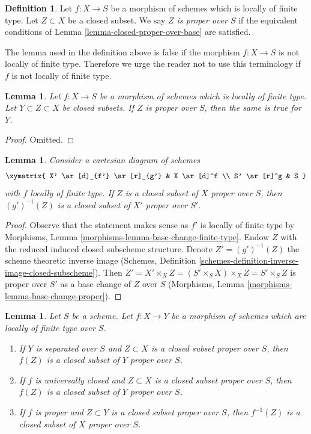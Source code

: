\documentclass[10pt,a4paper]{amsart}
\theoremstyle{plain}
\newtheorem{lemma}[subsection]{Lemma}
\theoremstyle{definition}
\newtheorem{definition}[subsection]{Definition}
\theoremstyle{remark}
\numberwithin{equation}{subsection}
\begin{document}
\begin{definition}
\label{definition-proper-over-base}
Let $f : X \to S$ be a morphism of schemes which is locally of finite type.
Let $Z \subset X$ be a closed subset.
We say {\it $Z$ is proper over $S$}
if the equivalent conditions of Lemma \ref{lemma-closed-proper-over-base}
are satisfied.
\end{definition}

\noindent
The lemma used in the definition above is false if the morphism
$f : X \to S$ is not locally of finite type. Therefore we urge
the reader not to use this terminology if $f$ is not locally of
finite type.

\begin{lemma}
\label{lemma-closed-closed-proper-over-base}
Let $f : X \to S$ be a morphism of schemes which is locally of finite type.
Let $Y \subset Z \subset X$ be closed subsets.
If $Z$ is proper over $S$, then the same is true for $Y$.
\end{lemma}

\begin{proof}
Omitted.
\end{proof}

\begin{lemma}
\label{lemma-base-change-closed-proper-over-base}
Consider a cartesian diagram of schemes
$$
\xymatrix{
X' \ar[d]_{f'} \ar[r]_{g'} & X \ar[d]^f \\
S' \ar[r]^g & S
}
$$
with $f$ locally of finite type.
If $Z$ is a closed subset of $X$ proper over $S$, then
$(g')^{-1}(Z)$ is a closed subset of $X'$ proper over $S'$.
\end{lemma}

\begin{proof}
Observe that the statement makes sense as $f'$ is locally of
finite type by Morphisms, Lemma \ref{morphisms-lemma-base-change-finite-type}.
Endow $Z$ with the reduced induced closed subscheme structure.
Denote $Z' = (g')^{-1}(Z)$ the scheme theoretic inverse image
(Schemes, Definition \ref{schemes-definition-inverse-image-closed-subscheme}).
Then $Z' = X' \times_X Z = (S' \times_S X) \times_X Z = S' \times_S Z$
is proper over $S'$ as a base change of $Z$ over $S$
(Morphisms, Lemma \ref{morphisms-lemma-base-change-proper}).
\end{proof}

\begin{lemma}
\label{lemma-functoriality-closed-proper-over-base}
Let $S$ be a scheme. Let $f : X \to Y$ be a morphism of schemes which
are locally of finite type over $S$.
\begin{enumerate}
\item If $Y$ is separated over $S$ and $Z \subset X$ is a closed subset
proper over $S$, then $f(Z)$ is a closed subset of $Y$ proper over $S$.
\item If $f$ is universally closed and $Z \subset X$ is a
closed subset proper over $S$, then $f(Z)$ is a closed subset
of $Y$ proper over $S$.
\item If $f$ is proper and $Z \subset Y$ is a closed subset
proper over $S$, then $f^{-1}(Z)$ is a closed subset of $X$ proper over $S$.
\end{enumerate}
\end{lemma}
\end{document}

